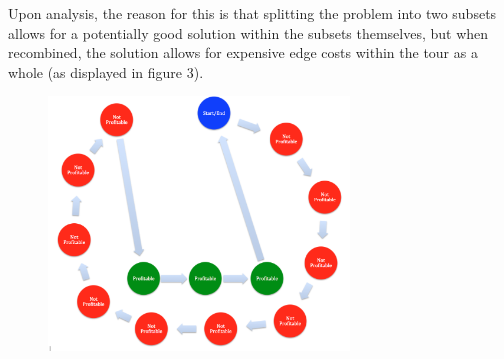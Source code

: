 \documentclass[a4paper,12pt]{article}
\begin{document}
Upon analysis, the reason for this is that splitting the problem into two subsets allows for a potentially good solution within the subsets themselves, but when recombined, the solution allows for expensive edge costs within the tour as a whole (as displayed in figure 3).
\begin{figure}[h]
\centering
\includegraphics[width=80mm]{TheIssue.png}
\end{figure}
\end{document}
